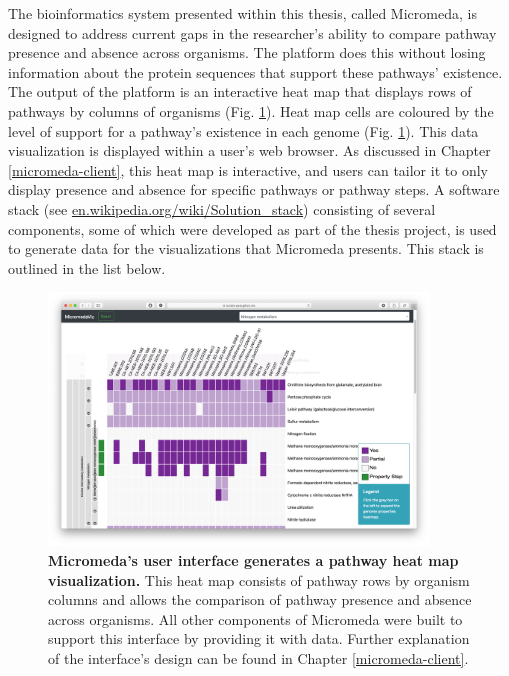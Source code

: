 The bioinformatics system presented within this thesis, called Micromeda, is 
designed to address current gaps in the researcher's ability to compare pathway 
presence and absence across organisms. The platform does this without losing 
information about the protein sequences that support these pathways' existence. 
The output of the platform is an interactive heat map that displays rows of 
pathways by columns of organisms (Fig. \ref{fig:basic-heatmap-overview}). Heat 
map cells are coloured by the level of support for a pathway's existence in each 
genome (Fig. \ref{fig:basic-heatmap-overview}). This data visualization is 
displayed within a user's web browser. As discussed in Chapter 
\ref{micromeda-client}, this heat map is interactive, and users can tailor it to 
only display presence and absence for specific pathways or pathway steps. A 
software stack (see 
\href{http://en.wikipedia.org/wiki/Solution_stack}{en.wikipedia.org/wiki/Solution\_stack}) 
consisting of several components, some of which were developed as part of the 
thesis project, is used to generate data for the visualizations that Micromeda 
presents. This stack is outlined in the list below.

\begin{figure}[!ht]
  \centering
	\includegraphics[width=0.9\textwidth]{media/Micromeda-Simple-Overview.png}
	 \caption[Micromeda's user interface generates a pathway heat map 
visualization.]{\textbf{Micromeda's user interface generates a pathway heat map 
visualization.} This heat map consists of pathway rows by organism columns and 
allows the comparison of pathway presence and absence across organisms. All 
other components of Micromeda were built to support this interface by providing 
it with data. Further explanation of the interface's design can be found in 
Chapter \ref{micromeda-client}.}
	 \label{fig:basic-heatmap-overview}
\end{figure}

